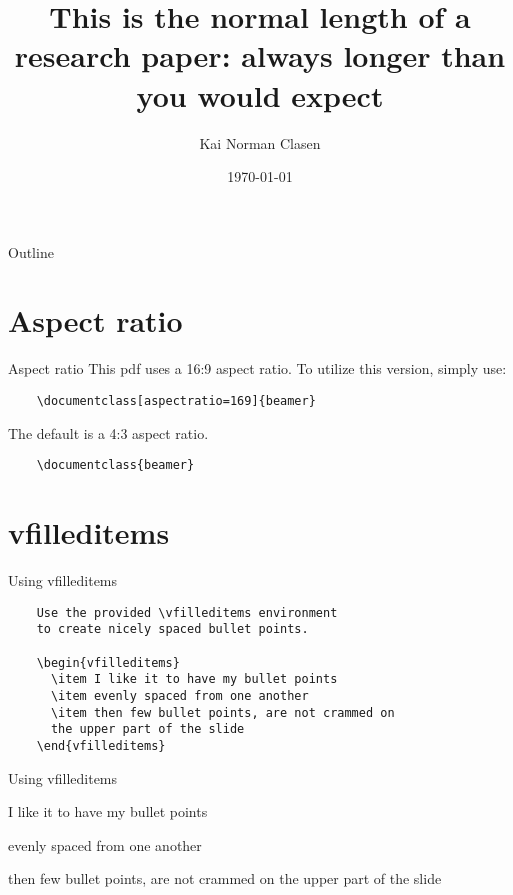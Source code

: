 \documentclass[aspectratio=169]{beamer}
\title[short title]{This is the normal length of a research paper:
always longer than you would expect}
\author{Kai Norman Clasen}
\institute{Insitute name}
\date{\today}
\begin{document}
\maketitle

\begin{frame}{Outline}
  \tableofcontents
\end{frame}

\section{Aspect ratio}
\begin{frame}[fragile]{Aspect ratio}
  This pdf uses a 16:9 aspect ratio. To utilize
  this version, simply use:
  \begin{verbatim}
    \documentclass[aspectratio=169]{beamer}
    \end{verbatim}
  \vfill
  The default is a 4:3 aspect ratio.
  \begin{verbatim}
    \documentclass{beamer}
  \end{verbatim}
\end{frame}

\section{vfilleditems}
\begin{frame}[fragile]{Using vfilleditems}
  \begin{verbatim}
    Use the provided \vfilleditems environment 
    to create nicely spaced bullet points.

    \begin{vfilleditems}
      \item I like it to have my bullet points
      \item evenly spaced from one another
      \item then few bullet points, are not crammed on 
      the upper part of the slide
    \end{vfilleditems}
    \end{verbatim}
\end{frame}

\begin{frame}{Using vfilleditems}
  \begin{vfilleditems}
    \item I like it to have my bullet points
    \item evenly spaced from one another
    \item then few bullet points, are not crammed on
    the upper part of the slide
  \end{vfilleditems}
\end{frame}
\end{document}
